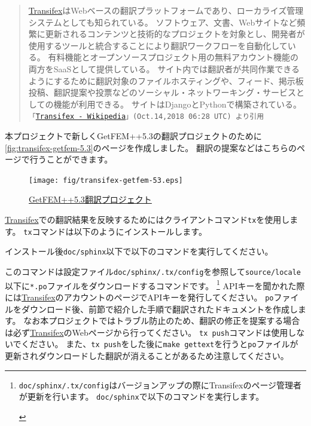 \documentclass{../../style/ltjoc}
\begin{document}
\begin{quote}
\href{https://www.transifex.com}{Transifex}はWebベースの翻訳プラットフォームであり、ローカライズ管理システムとしても知られている。 
ソフトウェア、文書、Webサイトなど頻繁に更新されるコンテンツと技術的なプロジェクトを対象とし、開発者が使用するツールと統合することにより翻訳ワークフローを自動化している。
有料機能とオープンソースプロジェクト用の無料アカウント機能の両方をSaaSとして提供している。
サイト内では翻訳者が共同作業できるようにするために翻訳対象のファイルホスティングや、フィード、掲示板投稿、翻訳提案や投票などのソーシャル・ネットワーキング・サービスとしての機能が利用できる。
サイトはDjangoとPythonで構築されている。
\texttt{「\href{https://ja.wikipedia.org/wiki/Transifex}{Transifex - Wikipedia}」(Oct.14,2018 06:28 UTC) より引用}
\end{quote}
本プロジェクトで新しくGetFEM++5.3の翻訳プロジェクトのために\autoref{fig:transifex-getfem-5.3}のページを作成しました。
翻訳の提案などはこちらのページで行うことができます。
\begin{figure}[htbp]
\centering
\texttt{[image: fig/transifex-getfem-53.eps]}
\caption{\href{https://www.transifex.com/getfem-doc/getfem-53-1/dashboard/}{GetFEM++5.3翻訳プロジェクト}}
\label{fig:transifex-getfem-5.3}
\end{figure}
\href{https://www.transifex.com}{Transifex}での翻訳結果を反映するためにはクライアントコマンド\texttt{tx}を使用します。
\texttt{tx}コマンドは以下のようにインストールします。
\begin{shbox}
\end{shbox}
インストール後\texttt{doc/sphinx}以下で以下のコマンドを実行してください。
\begin{shbox}
\end{shbox}
このコマンドは設定ファイル\texttt{doc/sphinx/.tx/config}を参照して\texttt{source/locale}以下に\texttt{*.po}ファイルをダウンロードするコマンドです。
\footnote{
\texttt{doc/sphinx/.tx/config}はバージョンアップの際にTransifexのページ管理者が更新を行います。
\texttt{doc/sphinx}で以下のコマンドを実行します。
\begin{shbox}
\end{shbox}
}
APIキーを聞かれた際には\href{https://www.transifex.com}{Transifex}のアカウントのページでAPIキーを発行してください。
\texttt{po}ファイルをダウンロード後、前節で紹介した手順で翻訳されたドキュメントを作成します。
なお本プロジェクトではトラブル防止のため、翻訳の修正を提案する場合は必ず\href{https://www.transifex.com}{Transifex}のWebページから行ってください。
\texttt{tx push}コマンドは使用しないでください。
また、\texttt{tx push}をした後に\texttt{make gettext}を行うと\texttt{po}ファイルが更新されダウンロードした翻訳が消えることがあるため注意してください。
\end{document}
